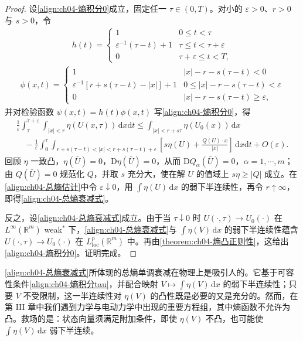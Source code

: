 \documentclass[../../main.tex]{subfiles}
\begin{document}
\begin{proof}
设\eqref{align:ch04-熵积分0}成立，固定任一 $\tau\in(0,T)$。对小的 $\varepsilon>0$、$r>0$ 与 $s>0$，令
\begin{align}
h(t)=
\begin{cases}
1&0\leqslant t<\tau\\
\varepsilon^{-1}(\tau-t)+1&\tau\leqslant t<\tau+\varepsilon\\
0&\tau+\varepsilon\leqslant t<T,
\end{cases}
\label{align:ch04-h(t)}
\end{align}
\begin{align}
\phi(x,t)=
\begin{cases}
1&|x|-r-s(\tau-t)<0\\
\varepsilon^{-1}[r+s(\tau-t)-|x|]+1&0\leqslant|x|-r-s(\tau-t)<\varepsilon\\
0&|x|-r-s(\tau-t)\geqslant\varepsilon,
\end{cases}
\label{align:ch04-phi(x,t)}
\end{align}
并对检验函数 $\psi(x,t)=h(t)\phi(x,t)$ 写\eqref{align:ch04-熵积分0}，得
\begin{align}
\frac{1}{\varepsilon}\int_{\tau}^{\tau+\varepsilon}\int_{|x|<r}\eta(U(x,\tau))\,\mathrm{d}x\mathrm{d}t\leqslant\int_{|x|<r+s\tau}\eta(U_{0}(x))\,\mathrm{d}x\nonumber\\
\quad-\frac{1}{\varepsilon}\int_{0}^{\tau}\int_{r+s(\tau-t)<|x|<r+s(\tau-t)+\varepsilon}\left[s\eta(U)+\frac{Q(U)\cdot x}{|x|}\right]\,\mathrm{d}x\mathrm{d}t+O(\varepsilon).
\label{align:ch04-总熵估计}
\end{align}
回顾 $\eta$ 一致凸，$\eta(\bar{U})=0$，$\mathrm{D}\eta(\bar{U})=0$，从而 $\mathrm{D}Q_{\alpha}(\bar{U})=0$，$\alpha=1,\cdots,m$；由 $Q(\bar{U})=0$ 规范化 $Q$，并取 $s$ 充分大，使在解 $U$ 的值域上 $s\eta\geqslant|Q|$ 成立。在\eqref{align:ch04-总熵估计}中令 $\varepsilon\downarrow 0$，用 $\int\eta(U)\,\mathrm{d}x$ 的弱下半连续性，再令 $r\uparrow\infty$，即得\eqref{align:ch04-总熵衰减式}。

反之，设\eqref{align:ch04-总熵衰减式}成立。由于当 $\tau\downarrow 0$ 时 $U(\cdot,\tau)\to U_{0}(\cdot)$ 在 $L^{\infty}(\mathbb{R}^{m})$ weak$^{*}$ 下，\eqref{align:ch04-总熵衰减式}与 $\int\eta(V)\,\mathrm{d}x$ 的弱下半连续性蕴含 $U(\cdot,\tau)\to U_{0}(\cdot)$ 在 $L_{\mathrm{loc}}^{p}(\mathbb{R}^{m})$ 中。再由\cref{theorem:ch04-熵凸正则性}，这给出\eqref{align:ch04-熵积分0}。证明完成。
\end{proof}

\eqref{align:ch04-总熵衰减式}所体现的总熵单调衰减在物理上是吸引人的。它基于可容性条件\eqref{align:ch04-熵积分tau}，并配合映射 $V\mapsto\int\eta(V)\,\mathrm{d}x$ 的弱下半连续性；只要 $V$ 不受限制，这一半连续性对 $\eta(V)$ 的凸性既是必要的又是充分的。然而，在第 III 章中我们遇到力学与电动力学中出现的重要方程组，其中熵函数不允许为凸。救场的是：状态向量须满足附加条件，即使 $\eta(V)$ 不凸，也可能使 $\int\eta(V)\,\mathrm{d}x$ 弱下半连续。
\end{document}
